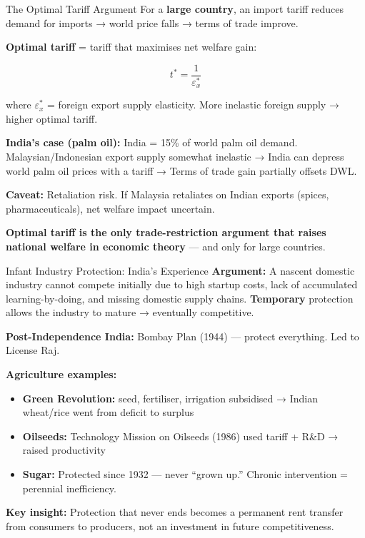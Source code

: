\documentclass[
  ignorenonframetext,
  aspectratio=169,
]{beamer}
\makeatletter
\providecommand{\tightlist}{%
  \setlength{\itemsep}{0pt}\setlength{\parskip}{0pt}}
\let\quarto@originallabel\label
\DeclareRobustCommand*{\label}[1]{\quarto@originallabel{#1}}
\makeatother
\begin{document}
\begin{frame}{The Optimal Tariff Argument}
\label{the-optimal-tariff-argument}
For a \textbf{large country}, an import tariff reduces demand for
imports → world price falls → terms of trade improve.

\textbf{Optimal tariff} = tariff that maximises net welfare gain:

\[t^* = \frac{1}{\varepsilon_x^*}\]

where \(\varepsilon_x^*\) = foreign export supply elasticity. More
inelastic foreign supply → higher optimal tariff.

\textbf{India's case (palm oil):} India = 15\% of world palm oil demand.
Malaysian/Indonesian export supply somewhat inelastic → India can
depress world palm oil prices with a tariff → Terms of trade gain
partially offsets DWL.

\textbf{Caveat:} Retaliation risk. If Malaysia retaliates on Indian
exports (spices, pharmaceuticals), net welfare impact uncertain.

\textbf{Optimal tariff is the only trade-restriction argument that
raises national welfare in economic theory} --- and only for large
countries.
\end{frame}

\begin{frame}{Infant Industry Protection: India's Experience}
\label{infant-industry-protection-indias-experience}
\textbf{Argument:} A nascent domestic industry cannot compete initially
due to high startup costs, lack of accumulated learning-by-doing, and
missing domestic supply chains. \textbf{Temporary} protection allows the
industry to mature → eventually competitive.

\textbf{Post-Independence India:} Bombay Plan (1944) --- protect
everything. Led to License Raj.

\textbf{Agriculture examples:}

\begin{itemize}
\tightlist
\item
  \textbf{Green Revolution:} seed, fertiliser, irrigation subsidised →
  Indian wheat/rice went from deficit to surplus
\item
  \textbf{Oilseeds:} Technology Mission on Oilseeds (1986) used tariff +
  R\&D → raised productivity
\item
  \textbf{Sugar:} Protected since 1932 --- never ``grown up.'' Chronic
  intervention = perennial inefficiency.
\end{itemize}

\textbf{Key insight:} Protection that never ends becomes a permanent
rent transfer from consumers to producers, not an investment in future
competitiveness.
\end{frame}
\end{document}
